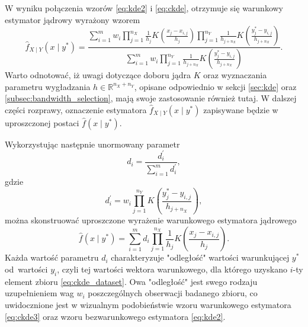 \documentclass[12pt,a4paper,oneside]{book}
\theoremstyle{definition}
\begin{document}
W wyniku połączenia wzorów \eqref{eq:kde2} i \eqref{eq:ckde}, otrzymuje się warunkowy estymator jądrowy wyrażony wzorem
\begin{equation} \label{eq:ckde2}
\hat{f}_{X \mid Y}(x \mid y^*) = \frac{\sum_{i=1}^m w_i \prod_{j=1}^{n_X} \frac{1}{h_j} K \left( \frac{x_j-x_{i,j}}{h_j} \right) \prod_{j=1}^{n_Y} \frac{1}{h_{j+n_X}} K \left( \frac{y^*_j-y_{i,j}}{h_{j+n_X}} \right)}
{\sum_{i=1}^m w_i \prod_{j=1}^{n_Y} \frac{1}{h_{j+n_X}} K \left( \frac{y^*_j-y_{i,j}}{h_{j+n_X}} \right)}.
\end{equation}
Warto odnotować, iż uwagi dotyczące doboru jądra $K$ oraz wyznaczania parametru wygładzania $h \in \mathbb{R}^{n_X+n_Y}$, opisane odpowiednio w sekcji \ref{sec:kde} oraz \ref{subsec:bandwidth_selection}, mają swoje zastosowanie również tutaj.
W dalszej części rozprawy, oznaczenie estymatora $\hat{f}_{X \mid Y}(x \mid y^*)$ zapisywane będzie w uproszczonej postaci $\hat{f}(x \mid y^*)$.

Wykorzystując następnie unormowany parametr
\begin{equation} \label{eq:d}
d_i = \frac{d_i^\prime}{\sum_{i=1}^m d_i^\prime},
\end{equation}
gdzie
\begin{equation} \label{eq:d_prim}
d_i^\prime = w_i \prod_{j=1}^{n_Y} K \left( \frac{y^*_j-y_{i,j}}{h_{j+n_X}} \right),
\end{equation}
można skonstruować uproszczone wyrażenie warunkowego estymatora jądrowego
\begin{equation} \label{eq:ckde3}
\hat{f}(x \mid y^*) = \sum_{i=1}^m d_i \prod_{j=1}^{n_X} \frac{1}{h_j} K \left( \frac{x_j-x_{i,j}}{h_j} \right).
\end{equation}
Każda wartość parametru $d_i$ charakteryzuje "odległość" wartości warunkującej $y^*$ od~wartości $y_i$, czyli tej wartości wektora warunkowego, dla którego uzyskano $i$-ty element zbioru \eqref{eq:ckde_dataset}. Owa "odległość" jest swego rodzaju uzupełnieniem wag $w_i$ poszczególnych obserwacji badanego zbioru, co uwidocznione jest w wizualnym podobieństwie wzoru warunkowego estymatora \eqref{eq:ckde3} oraz wzoru bezwarunkowego estymatora \eqref{eq:kde2}.
\end{document}
